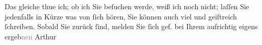 \pstart
           Das gleiche thue ich; ob ich Sie beſuchen werde, weiß ich noch nicht; laſſen Sie
               jedenfalls in Kürze was von{ }ſich hören, Sie können auch viel und geiſtreich{ }ſchreiben. Sobald Sie zurück{ }ſind, melden Sie{ }ſich gef. bei Ihrem aufrichtig eigens
                  ergeb\textcolor{gray}{nen}\pend
           \pstart \spacefill\mbox{Arthur}\pend{}\endnumbering{}  \newcommand{\dateiname}{L00015}\newcommand{\titel}{Arthur Schnitzler an Richard Beer-Hofmann, [22. oder 23]. 5. 1891}\newcommand{\editorInnen}{Martin Anton Müller und Gerd-Hermann Susen}
